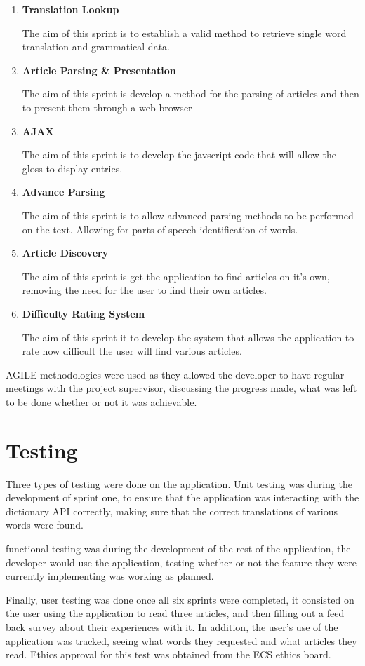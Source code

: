 \begin{enumerate}
	\item \textbf{Translation Lookup}
	
	The aim of this sprint is to establish a valid method to retrieve single word translation and grammatical data.
	
	\item \textbf{Article Parsing \& Presentation}
	
	The aim of this sprint is develop a method for the parsing of articles and then to present them through a web browser
	
	\item \textbf{AJAX}
	
	The aim of this sprint is to develop the javscript code that will allow the gloss to display entries.
	
	\item \textbf{Advance Parsing}
	
	The aim of this sprint is to allow advanced parsing methods to be performed on the text. Allowing for parts of speech identification of words. 
	
	\item \textbf{Article Discovery}
	
	The aim of this sprint is get the application to find articles on it's own, removing the need for the user to find their own articles.
	
	\item \textbf{Difficulty Rating System}
	
	The aim of this sprint it to develop the system that allows the application to rate how difficult the user will find various articles. 
	
\end{enumerate}

AGILE methodologies were used as they allowed the developer to have regular meetings with the project supervisor, discussing the progress made, what was left to be done whether or not it was achievable.

\section{Testing}

Three types of testing were done on the application. Unit testing was during the development of sprint one, to ensure that the application was interacting with the dictionary API correctly, making sure that the correct translations of various words were found. 

functional testing was during the development of the rest of the application, the developer would use the application, testing whether or not the feature they were currently implementing was working as planned.

Finally, user testing was done once all six sprints were completed, it consisted on the user using the application to read three articles, and then filling out a feed back survey about their experiences with it. In addition, the user's use of the application was tracked, seeing what words they requested and what articles they read. Ethics approval for this test was obtained from the ECS ethics board. 